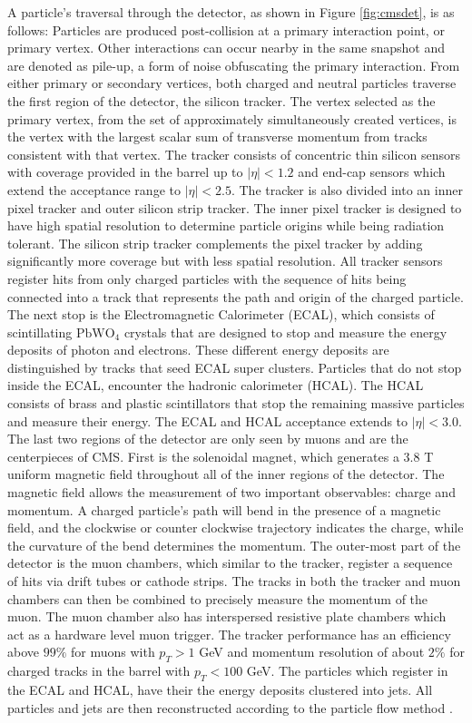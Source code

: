 A particle's traversal through the detector, as shown in Figure \ref{fig:cmsdet}, is as follows: Particles are produced post-collision at a primary interaction point, or primary vertex. Other interactions can occur nearby in the same snapshot and are denoted as pile-up, a form of noise obfuscating the primary interaction. From either primary or secondary vertices, both charged and neutral particles traverse the first region of the detector, the silicon tracker. The vertex selected as the primary vertex, from the set of approximately simultaneously created vertices, is the vertex with the largest scalar sum of transverse momentum from tracks consistent with that vertex. The tracker consists of concentric thin silicon sensors with coverage provided in the barrel up to $|\eta|<1.2$ and end-cap sensors which extend the acceptance range to $|\eta| < 2.5$. The tracker is also divided into an inner pixel tracker and outer silicon strip tracker. The inner pixel tracker is designed to have high spatial resolution to determine particle origins while being radiation tolerant. The silicon strip tracker complements the pixel tracker by adding significantly more coverage but with less spatial resolution. All tracker sensors  register hits from only charged particles with the sequence of hits being connected into a track that represents the path and origin of the charged particle.  The next stop is the Electromagnetic Calorimeter (ECAL), which consists of scintillating $\text{PbWO}_4$ crystals that are designed to stop and measure the energy deposits of photon and electrons. These different energy deposits are distinguished by tracks that seed ECAL super clusters. Particles that do not stop inside the ECAL, encounter the hadronic calorimeter (HCAL). The HCAL consists of brass and plastic scintillators that stop the remaining massive particles and measure their energy. The ECAL and HCAL acceptance extends to $|\eta| <3.0$. The last two regions of the detector are only seen by muons and are the centerpieces of CMS. First is the solenoidal magnet, which generates a 3.8 T uniform magnetic field throughout all of the inner regions of the detector. The magnetic field allows the measurement of two important observables: charge and momentum.  A charged particle's path will bend in the presence of a magnetic field, and the clockwise or counter clockwise trajectory indicates the charge, while the curvature of the bend determines the momentum. The outer-most part of the detector is the muon chambers, which similar to the tracker, register a sequence of hits via drift tubes or cathode strips. The tracks in both the tracker and muon chambers can then be combined to precisely measure the momentum of the muon. The muon chamber also has interspersed resistive plate chambers which act as a hardware level muon trigger. The tracker performance has an efficiency above $99\%$ for muons with $p_T > 1$ GeV and momentum resolution of about $2\%$ for charged tracks in the barrel with $p_T < 100$ GeV. The particles which register in the ECAL and HCAL, have their the energy deposits clustered into jets. All particles and jets are then reconstructed according to the particle flow method \cite{CMS:2017yfk} \cite{CMS:2008xjf} \cite{CMS:2017lum}.

